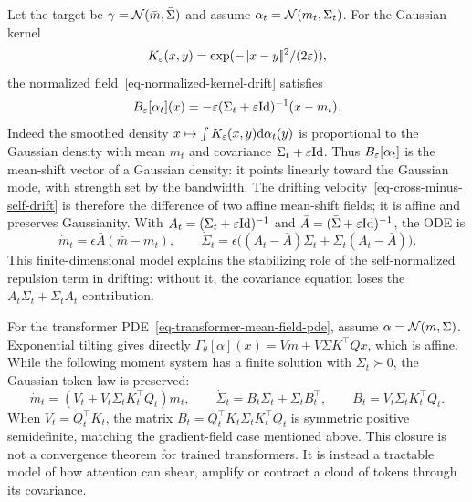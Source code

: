 \begin{example}
	Let the target be $\gamma=\mathcal{N}(\bar m,\bar\Sigma)$ and assume $\alpha_t=\mathcal{N}(m_t,\Sigma_t)$. For the Gaussian kernel
	\[
		K_\varepsilon(x,y)=\exp(-|\!| x-y |\!|^2/(2\varepsilon)),
	\]
	the normalized field~\eqref{eq-normalized-kernel-drift} satisfies
	\[
		B_\varepsilon[\alpha_t](x)
		=
		-\varepsilon(\Sigma_t+\varepsilon\mathrm{Id})^{-1}(x-m_t).
	\]
	Indeed the smoothed density \(x\mapsto\int K_\varepsilon(x,y)\mathrm{d}\alpha_t(y)\) is proportional to the Gaussian density with mean $m_t$ and covariance $\Sigma_t+\varepsilon\mathrm{Id}$. Thus \(B_\varepsilon[\alpha_t]\) is the mean-shift vector of a Gaussian density: it points linearly toward the Gaussian mode, with strength set by the bandwidth. The drifting velocity~\eqref{eq-cross-minus-self-drift} is therefore the difference of two affine mean-shift fields; it is affine and preserves Gaussianity. With $A_t=(\Sigma_t+\varepsilon\mathrm{Id})^{-1}$ and $\bar A=(\bar\Sigma+\varepsilon\mathrm{Id})^{-1}$, the ODE is
	\[
		\dot m_t=\epsilon\bar A(\bar m-m_t),
		\qquad
		\dot\Sigma_t=\epsilon\bigl((A_t-\bar A)\Sigma_t+\Sigma_t(A_t-\bar A)\bigr).
	\]
	This finite-dimensional model explains the stabilizing role of the self-normalized repulsion term in drifting: without it, the covariance equation loses the $A_t\Sigma_t+\Sigma_tA_t$ contribution.
\end{example}

\begin{example}
	For the transformer PDE~\eqref{eq-transformer-mean-field-pde}, assume $\alpha=\mathcal{N}(m,\Sigma)$. Exponential tilting gives directly
	$\Gamma_\theta[\alpha](x)=Vm+V\Sigma K^\top Qx$, which is affine. While the following moment system has a finite solution with $\Sigma_t\succ0$, the Gaussian token law is preserved:
	\[
		\dot m_t=(V_t+V_t\Sigma_tK_t^\top Q_t)m_t,
		\qquad
		\dot\Sigma_t=B_t\Sigma_t+\Sigma_tB_t^\top,
		\qquad
		B_t=V_t\Sigma_tK_t^\top Q_t.
	\]
	When $V_t=Q_t^\top K_t$, the matrix $B_t=Q_t^\top K_t\Sigma_tK_t^\top Q_t$ is symmetric positive semidefinite, matching the gradient-field case mentioned above.
	This closure is not a convergence theorem for trained transformers. It is instead a tractable model of how attention can shear, amplify or contract a cloud of tokens through its covariance.
\end{example}

